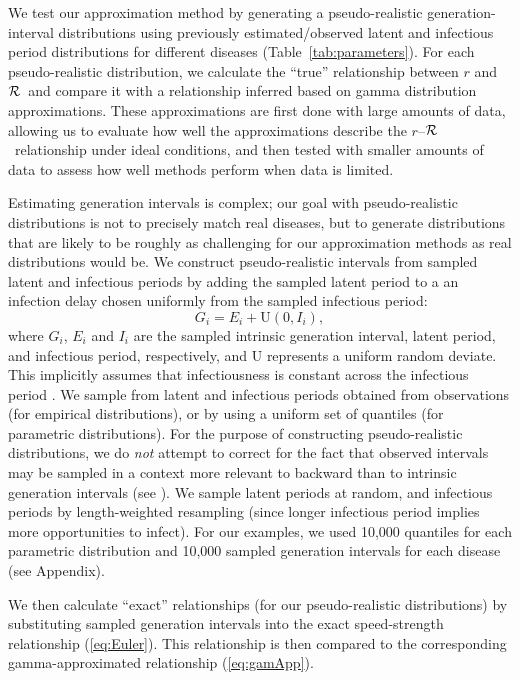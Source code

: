 \documentclass[12pt]{article}
\newcommand{\rR}{\mbox{$r$--$\cal R$}}
\newcommand{\RR}{\ensuremath{{\cal R}}}
\newcommand{\eref}[1]{(\ref{eq:#1})}
\newcommand{\tref}[1]{Table~\ref{tab:#1}}
\begin{document}
We test our approximation method by generating a pseudo-realistic generation-interval distributions using previously estimated/observed latent and infectious period distributions for different diseases (\tref{parameters}).
For each pseudo-realistic distribution, we calculate the ``true'' relationship between $r$ and \RR\ and compare it with a relationship inferred based on gamma distribution approximations. 
These approximations are first done with large amounts of data, allowing us to evaluate how well the approximations describe the \rR\ relationship under ideal conditions, and then tested with smaller amounts of data to assess how well methods perform when data is limited. 

Estimating generation intervals is complex; our goal with pseudo-realistic distributions is not to precisely match real diseases, but to generate distributions that are likely to be roughly as challenging for our approximation methods as real distributions would be.
We construct pseudo-realistic intervals from sampled latent and infectious periods by adding the sampled latent period to a an infection delay chosen uniformly from the sampled infectious period:
\begin{equation}
	G_i = E_i + \mathrm{U}(0, I_i),
\end{equation}
where $G_i$, $E_i$ and $I_i$ are the sampled intrinsic generation interval, latent period, and infectious period, respectively, and $\mathrm{U}$ represents a uniform random deviate.
This implicitly assumes that infectiousness is constant across the infectious period \cite{HampDush09}.
We sample from latent and infectious periods obtained from observations (for empirical distributions), or by using a uniform set of quantiles (for parametric distributions).
For the purpose of constructing pseudo-realistic distributions, we do \emph{not} attempt to correct for the fact that observed intervals may be sampled in a context more relevant to backward than to intrinsic generation intervals (see \cite{ChamDush15}).
We sample latent periods at random, and infectious periods by length-weighted resampling (since longer infectious period implies more opportunities to infect).
For our examples, we used 10,000 quantiles for each parametric distribution and 10,000 sampled generation intervals for each disease (see Appendix).


We then calculate ``exact'' relationships (for our pseudo-realistic distributions) by substituting sampled generation intervals into the exact speed-strength relationship \eref{Euler}.
This relationship is then compared to the corresponding gamma-approximated relationship \eref{gamApp}.
\end{document}
